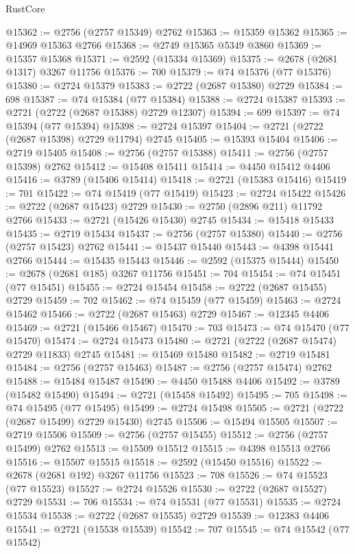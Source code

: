 \begin{lexlean}{RustCore}
\begin{coremodule}
@15362 := @2756 (@2757 @15349) @2762
@15363 := @15359 @15362
@15365 := @14969 @15363 @2766
@15368 := @2749 @15365 @5349 @3860
@15369 := @15357 @15368
@15371 := @2592 (@15334 @15369)
@15375 := @2678 (@2681 @1317) @3267 @11756
@15376 := 700
@15379 := @74 @15376 (@77 @15376)
@15380 := @2724 @15379
@15383 := @2722 (@2687 @15380) @2729
@15384 := 698
@15387 := @74 @15384 (@77 @15384)
@15388 := @2724 @15387
@15393 := @2721 (@2722 (@2687 @15388) @2729 @12307)
@15394 := 699
@15397 := @74 @15394 (@77 @15394)
@15398 := @2724 @15397
@15404 := @2721 (@2722 (@2687 @15398) @2729 @11794) @2745
@15405 := @15393 @15404
@15406 := @2719 @15405
@15408 := @2756 (@2757 @15388)
@15411 := @2756 (@2757 @15398) @2762
@15412 := @15408 @15411
@15414 := @4450 @15412 @4406
@15416 := @3789 (@15406 @15414)
@15418 := @2721 (@15383 @15416)
@15419 := 701
@15422 := @74 @15419 (@77 @15419)
@15423 := @2724 @15422
@15426 := @2722 (@2687 @15423) @2729
@15430 := @2750 (@2896 @211) @11792 @2766
@15433 := @2721 (@15426 @15430) @2745
@15434 := @15418 @15433
@15435 := @2719 @15434
@15437 := @2756 (@2757 @15380)
@15440 := @2756 (@2757 @15423) @2762
@15441 := @15437 @15440
@15443 := @4398 @15441 @2766
@15444 := @15435 @15443
@15446 := @2592 (@15375 @15444)
@15450 := @2678 (@2681 @185) @3267 @11756
@15451 := 704
@15454 := @74 @15451 (@77 @15451)
@15455 := @2724 @15454
@15458 := @2722 (@2687 @15455) @2729
@15459 := 702
@15462 := @74 @15459 (@77 @15459)
@15463 := @2724 @15462
@15466 := @2722 (@2687 @15463) @2729
@15467 := @12345 @4406
@15469 := @2721 (@15466 @15467)
@15470 := 703
@15473 := @74 @15470 (@77 @15470)
@15474 := @2724 @15473
@15480 := @2721 (@2722 (@2687 @15474) @2729 @11833) @2745
@15481 := @15469 @15480
@15482 := @2719 @15481
@15484 := @2756 (@2757 @15463)
@15487 := @2756 (@2757 @15474) @2762
@15488 := @15484 @15487
@15490 := @4450 @15488 @4406
@15492 := @3789 (@15482 @15490)
@15494 := @2721 (@15458 @15492)
@15495 := 705
@15498 := @74 @15495 (@77 @15495)
@15499 := @2724 @15498
@15505 := @2721 (@2722 (@2687 @15499) @2729 @15430) @2745
@15506 := @15494 @15505
@15507 := @2719 @15506
@15509 := @2756 (@2757 @15455)
@15512 := @2756 (@2757 @15499) @2762
@15513 := @15509 @15512
@15515 := @4398 @15513 @2766
@15516 := @15507 @15515
@15518 := @2592 (@15450 @15516)
@15522 := @2678 (@2681 @192) @3267 @11756
@15523 := 708
@15526 := @74 @15523 (@77 @15523)
@15527 := @2724 @15526
@15530 := @2722 (@2687 @15527) @2729
@15531 := 706
@15534 := @74 @15531 (@77 @15531)
@15535 := @2724 @15534
@15538 := @2722 (@2687 @15535) @2729
@15539 := @12383 @4406
@15541 := @2721 (@15538 @15539)
@15542 := 707
@15545 := @74 @15542 (@77 @15542)

\end{coremodule}
\end{lexlean}
